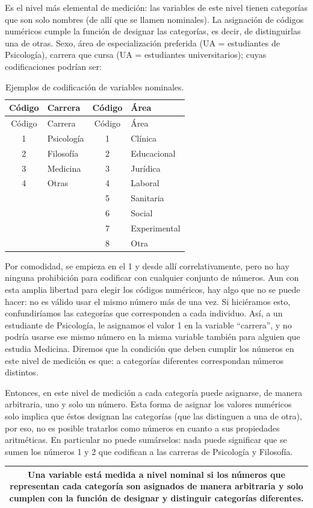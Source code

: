 \documentclass[]{book}
\begin{document}
Es el nivel más elemental de medición: las variables de este nivel tienen categorías que son solo nombres (de allí que se llamen nominales). La asignación de códigos numéricos cumple la función de designar las categorías, es decir, de distinguirlas una de otras. Sexo, área de especialización preferida (UA = estudiantes de Psicología), carrera que cursa (UA = estudiantes universitarios); cuyas codificaciones podrían ser:

\begin{longtable}[]{@{}clcl@{}}
\caption{\label{tab:nivelNomCod}Ejemplos de codificación de variables nominales.}\tabularnewline
\toprule
Código & Carrera & Código & Área\tabularnewline
\midrule
\endfirsthead
\toprule
Código & Carrera & Código & Área\tabularnewline
\midrule
\endhead
1 & Psicología & 1 & Clínica\tabularnewline
2 & Filosofía & 2 & Educacional\tabularnewline
3 & Medicina & 3 & Jurídica\tabularnewline
4 & Otras & 4 & Laboral\tabularnewline
& & 5 & Sanitaria\tabularnewline
& & 6 & Social\tabularnewline
& & 7 & Experimental\tabularnewline
& & 8 & Otra\tabularnewline
\bottomrule
\end{longtable}

Por comodidad, se empieza en el 1 y desde allí correlativamente, pero no hay ninguna prohibición para codificar con cualquier conjunto de números. Aun con esta amplia libertad para elegir los códigos numéricos, hay algo que no se puede hacer: no es válido usar el mismo número más de una vez. Si hiciéramos esto, confundiríamos las categorías que corresponden a cada individuo. Así, a un estudiante de Psicología, le asignamos el valor 1 en la variable ``carrera'', y no podría usarse ese mismo número en la misma variable también para alguien que estudia Medicina. Diremos que la condición que deben cumplir los números en este nivel de medición es que: a categorías diferentes correspondan números distintos.

Entonces, en este nivel de medición a cada categoría puede asignarse, de manera arbitraria, uno y solo un número. Esta forma de asignar los valores numéricos solo implica que éstos designan las categorías (que las distinguen a una de otra), por eso, no es posible tratarlos como números en cuanto a sus propiedades aritméticas. En particular no puede sumárselos: nada puede significar que se sumen los números 1 y 2 que codifican a las carreras de Psicología y Filosofía.

\begin{longtable}[]{@{}c@{}}
\toprule
\endhead
\begin{minipage}[t]{0.97\columnwidth}\centering
Una variable está medida a nivel \textbf{nominal} si los números que representan cada categoría son asignados de manera arbitraria y solo cumplen con la función de designar y distinguir categorías diferentes.\strut
\end{minipage}\tabularnewline
\bottomrule
\end{longtable}
\end{document}
